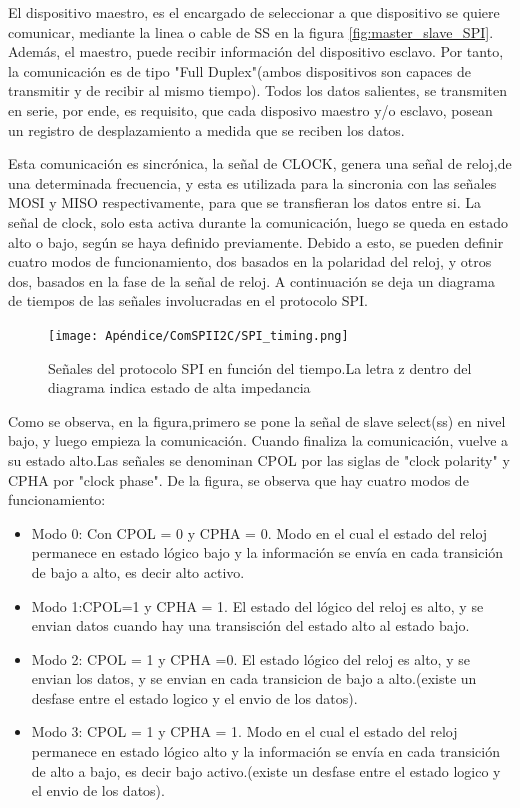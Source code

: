 El dispositivo maestro, es el encargado de seleccionar a que dispositivo se quiere comunicar, mediante la linea o cable de SS en la figura \ref{fig:master_slave_SPI}. Además, el maestro, puede recibir información del dispositivo esclavo. Por tanto, la comunicación es de tipo "Full Duplex"(ambos dispositivos son capaces de transmitir y de recibir al mismo tiempo). Todos los datos salientes, se transmiten en serie, por ende, es requisito, que cada disposivo maestro y/o esclavo, posean un registro de desplazamiento a medida que se reciben los datos.     
 
Esta comunicación es sincrónica, la señal de CLOCK, genera una señal de reloj,de una determinada frecuencia, y esta es utilizada para la sincronia con las señales MOSI y MISO respectivamente, para que se transfieran los datos entre si. La señal de clock, solo esta activa durante la comunicación, luego se queda en estado alto o bajo, según se haya definido previamente. Debido a esto, se pueden definir cuatro modos de funcionamiento, dos basados en la polaridad del reloj, y otros dos, basados en la fase de la señal de reloj. A continuación se deja un diagrama de tiempos de las señales involucradas en el protocolo SPI.  

\begin{figure}[ht]
	\texttt{[image: Apéndice/ComSPII2C/SPI\_timing.png]}
	\caption{Señales del protocolo SPI en función del tiempo.La letra z dentro del diagrama indica estado de alta impedancia}
	\label{fig:señales_SPI}
\end{figure}

Como se observa, en la figura,primero se pone la señal de slave select(ss) en nivel bajo, y luego empieza la comunicación. Cuando finaliza la comunicación, vuelve a su estado alto.Las señales se denominan CPOL por las siglas de "clock polarity" y CPHA por "clock phase". De la figura, se observa que hay cuatro modos de funcionamiento: 

\begin{itemize}
	\item Modo 0: Con CPOL = 0 y CPHA = 0. Modo en el cual el estado del reloj permanece en estado lógico bajo y la información se envía en cada transición de bajo a alto, es decir alto activo.
	\item Modo 1:CPOL=1 y CPHA = 1. El estado del lógico del reloj es alto, y se envian datos cuando hay una transisción del estado alto al estado bajo. 
	\item Modo 2: CPOL = 1 y CPHA =0. El estado lógico del reloj es alto, y se envian los datos, y se envian en cada transicion de bajo a alto.(existe un desfase entre el estado logico y el envio de los datos).   
	\item Modo 3: CPOL = 1 y CPHA = 1. Modo en el cual el estado del reloj permanece en estado lógico alto y la información se envía en cada transición de alto a bajo, es decir bajo activo.(existe un desfase entre el estado logico y el envio de los datos). 
\end{itemize}

